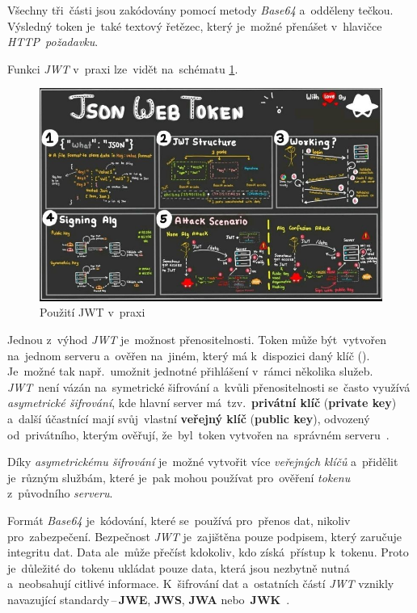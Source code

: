 \documentclass[11pt,a4paper]{report}
\let\oldacrshort\acrshort
\renewcommand{\acrshort}[1]{\emph{\normalsize\color[rgb]{0,0,0}\noindent\oldacrshort{#1}}}
\begin{document}
                Všechny tři~části jsou zakódovány pomocí metody \emph{Base64} a~odděleny tečkou. Výsledný token je~také textový řetězec, který je~možné přenášet v~hlavičce \emph{HTTP~požadavku}.

                Funkci \acrshort{JWT} v~praxi lze~vidět na~schématu \ref{model-jwt}.

                \begin{figure}
                    \centering
                    \includegraphics[width=.9\linewidth]{./files/img/jwt.jpg}
                    \caption{Použití JWT v~praxi}
                    \label{model-jwt}
                \end{figure}

                Jednou z~výhod \acrshort{JWT} je~možnost přenositelnosti. Token může být~vytvořen na~jednom serveru a~ověřen na~jiném, který má k~dispozici daný klíč (\cite{ieee:jwt}). Je~možné tak např.~umožnit jednotné přihlášení v~rámci několika služeb. \acrshort{JWT}~není vázán na~symetrické šifrování a~kvůli přenositelnosti se~často využívá \emph{asymetrické šifrování}, kde hlavní server má~tzv.~\textbf{privátní klíč} (\textbf{private key}) a~další účastnící mají svůj~vlastní \textbf{veřejný klíč} (\textbf{public key}), odvozený od~privátního, kterým ověřují, že~byl~token vytvořen na~správném serveru~\cite{miguelgrinbergJSONTokens}.
                
                Díky \emph{asymetrickému šifrování} je~možné vytvořit více \emph{veřejných klíčů} a~přidělit je~různým službám, které je~pak mohou používat pro~ověření \emph{tokenu} z~původního \emph{serveru}.

                Formát \emph{Base64} je~kódování, které se~používá pro~přenos dat, nikoliv pro~zabezpečení. Bezpečnost \acrshort{JWT} je~zajištěna pouze podpisem, který zaručuje integritu dat. Data ale~může přečíst kdokoliv, kdo získá~přístup k~tokenu. Proto je~důležité do~tokenu ukládat pouze data, která jsou nezbytně nutná a~neobsahují citlivé informace. K~šifrování dat a~ostatních částí \acrshort{JWT} vznikly navazující standardy\,--\,\textbf{JWE}, \textbf{JWS}, \textbf{JWA} nebo~\textbf{JWK}~\cite{jwtesak, graham2021ethical}.
\end{document}
